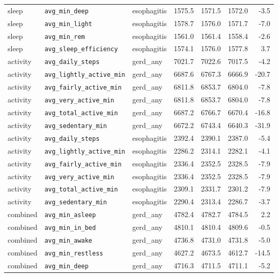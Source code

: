\documentclass[11pt]{article}
\newcommand{\code}[1]{\texttt{\small #1}}
\begin{document}
\begin{longtable}{@{}p{1.6cm}p{3.2cm}p{2.0cm}rrrr@{}}
sleep & \code{avg\_min\_deep} & esophagitis & 1575.5 & 1571.5 & 1572.0 & -3.5 \\
sleep & \code{avg\_min\_light} & esophagitis & 1578.7 & 1576.0 & 1571.7 & -7.0 \\
sleep & \code{avg\_min\_rem} & esophagitis & 1561.0 & 1561.4 & 1558.4 & -2.6 \\
sleep & \code{avg\_sleep\_efficiency} & esophagitis & 1574.1 & 1576.0 & 1577.8 & 3.7 \\
activity & \code{avg\_daily\_steps} & gerd\_any & 7021.7 & 7022.6 & 7017.5 & -4.2 \\
activity & \code{avg\_lightly\_active\_min} & gerd\_any & 6687.6 & 6767.3 & 6666.9 & -20.7 \\
activity & \code{avg\_fairly\_active\_min} & gerd\_any & 6811.8 & 6853.7 & 6804.0 & -7.8 \\
activity & \code{avg\_very\_active\_min} & gerd\_any & 6811.8 & 6853.7 & 6804.0 & -7.8 \\
activity & \code{avg\_total\_active\_min} & gerd\_any & 6687.2 & 6766.7 & 6670.4 & -16.8 \\
activity & \code{avg\_sedentary\_min} & gerd\_any & 6672.2 & 6743.4 & 6640.3 & -31.9 \\
activity & \code{avg\_daily\_steps} & esophagitis & 2392.4 & 2390.1 & 2387.0 & -5.4 \\
activity & \code{avg\_lightly\_active\_min} & esophagitis & 2286.2 & 2314.1 & 2282.1 & -4.1 \\
activity & \code{avg\_fairly\_active\_min} & esophagitis & 2336.4 & 2352.5 & 2328.5 & -7.9 \\
activity & \code{avg\_very\_active\_min} & esophagitis & 2336.4 & 2352.5 & 2328.5 & -7.9 \\
activity & \code{avg\_total\_active\_min} & esophagitis & 2309.1 & 2331.7 & 2301.2 & -7.9 \\
activity & \code{avg\_sedentary\_min} & esophagitis & 2290.4 & 2313.4 & 2286.7 & -3.7 \\
combined & \code{avg\_min\_asleep} & gerd\_any & 4782.4 & 4782.7 & 4784.5 & 2.2 \\
combined & \code{avg\_min\_in\_bed} & gerd\_any & 4810.1 & 4810.4 & 4809.6 & -0.5 \\
combined & \code{avg\_min\_awake} & gerd\_any & 4736.8 & 4731.0 & 4731.8 & -5.0 \\
combined & \code{avg\_min\_restless} & gerd\_any & 4627.2 & 4673.5 & 4612.7 & -14.5 \\
combined & \code{avg\_min\_deep} & gerd\_any & 4716.3 & 4711.5 & 4711.1 & -5.2 \\

\end{longtable}
\end{document}
